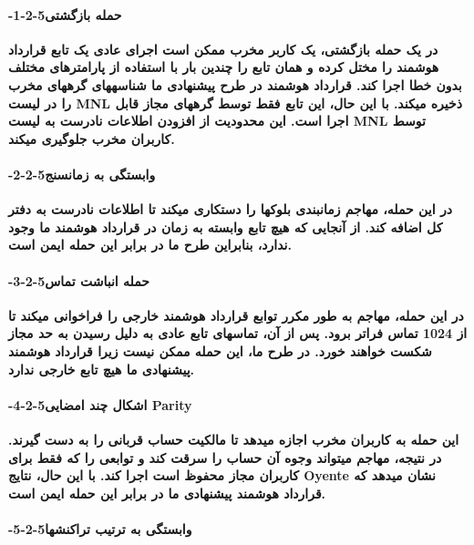 \documentclass{article} %
\begin{document}
\noindent 
\paragraph{ -1-2-5حمله بازگشتی}

\noindent 
{\bf در یک حمله بازگشتی، یک کاربر مخرب ممکن است اجرای عادی یک تابع قرارداد هوشمند را مختل کرده و همان تابع را چندین بار با استفاده از پارامترهای مختلف بدون خطا اجرا کند. قرارداد هوشمند در طرح پیشنهادی ما شناسههای گرههای مخرب را در لیست MNL ذخیره میکند. با این حال، این تابع فقط توسط گرههای مجاز قابل اجرا است. این محدودیت از افزودن اطلاعات نادرست به لیست MNL توسط کاربران مخرب جلوگیری میکند.}

\noindent 
\paragraph{ -2-2-5وابستگی به زمانسنج}

\noindent 
{\bf در این حمله، مهاجم زمانبندی بلوکها را دستکاری میکند تا اطلاعات نادرست به دفتر کل اضافه کند. از آنجایی که هیچ تابع وابسته به زمان در قرارداد هوشمند ما وجود ندارد، بنابراین طرح ما در برابر این حمله ایمن است.}

\noindent 
\paragraph{ -3-2-5حمله انباشت تماس}

\noindent 
{\bf در این حمله، مهاجم به طور مکرر توابع قرارداد هوشمند خارجی را فراخوانی میکند تا از 1024 تماس فراتر برود. پس از آن، تماسهای تابع عادی به دلیل رسیدن به حد مجاز شکست خواهند خورد. در طرح ما، این حمله ممکن نیست زیرا قرارداد هوشمند پیشنهادی ما هیچ تابع خارجی ندارد.}

\noindent 
\paragraph{ -4-2-5اشکال چند امضایی Parity}

\noindent 
{\bf این حمله به کاربران مخرب اجازه میدهد تا مالکیت حساب قربانی را به دست گیرند. در نتیجه، مهاجم میتواند وجوه آن حساب را سرقت کند و توابعی را که فقط برای کاربران مجاز محفوظ است اجرا کند. با این حال، نتایج Oyente نشان میدهد که قرارداد هوشمند پیشنهادی ما در برابر این حمله ایمن است.}

\noindent 
\paragraph{ -5-2-5وابستگی به ترتیب تراکنشها}
\end{document}
